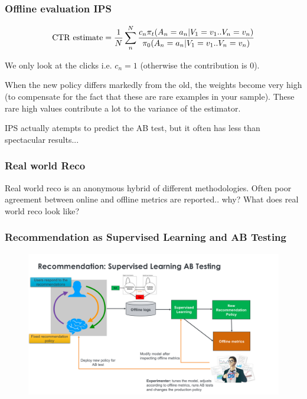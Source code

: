 \begin{frame}
  \frametitle{Offline evaluation IPS}
 
\[
{\rm CTR ~ estimate} = \frac{1}{N} \sum_n^N \frac{c_n \pi_t(A_n=a_n|V_1=v_1..V_n=v_n)}{\pi_0(A_n=a_n|V_1=v_1..V_n=v_n)}
\]

\pause
We only look at the clicks i.e. $c_n=1$ (otherwise the contribution is $0$).

\pause

When the new policy differs markedly from the old, the weights become
very high (to compensate for the fact that these are rare examples in
your sample).  These rare high values contribute a lot to the variance
of the estimator.


\pause
IPS actually atempts to predict the AB test, but it often has less
than spectacular results...   

 \end{frame}

\begin{frame}
  \frametitle{Real world Reco}

Real world reco is an anonymous hybrid of different methodologies.
Often poor agreement between online and offline metrics are
reported..  \pause why? \pause What does real world reco look like?

\end{frame}

  
\begin{frame}
  \frametitle{Recommendation as Supervised Learning and AB Testing}
 
 
   \begin{figure}[h!]
     \includegraphics[scale=0.3]{images/recoasabtesting0.png}
       \centering
       \label{motex1}
   \end{figure}
     
 \end{frame}

